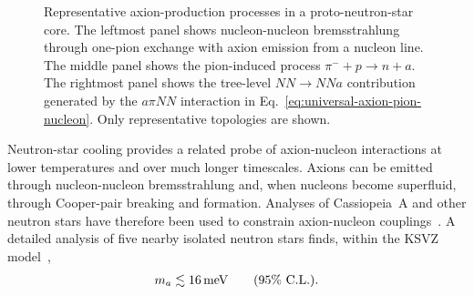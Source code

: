 \documentclass[review]{elsarticle}
\numberwithin{equation}{section}
\numberwithin{table}{section}
\numberwithin{figure}{section}
\begin{document}
\begin{figure}[t]
\begin{minipage}{0.32\textwidth}
    \end{minipage}

    \caption{Representative axion-production processes in a proto-neutron-star core. The leftmost panel shows nucleon-nucleon bremsstrahlung through one-pion exchange with axion emission from a nucleon line. The middle panel shows the pion-induced process $\pi^-+p\rightarrow n+a$. The rightmost panel shows the tree-level $NN\rightarrow NNa$ contribution generated by the $a\pi NN$ interaction in Eq.~\eqref{eq:universal-axion-pion-nucleon}. Only representative topologies are shown.}
    \label{fig:supernova-axion-processes}
\end{figure}

Neutron-star cooling provides a related probe of axion-nucleon interactions at lower temperatures and over much longer timescales. Axions can be emitted through nucleon-nucleon bremsstrahlung and, when nucleons become superfluid, through Cooper-pair breaking and formation. Analyses of Cassiopeia~A and other neutron stars have therefore been used to constrain axion-nucleon couplings~\cite{Hamaguchi:2018oqw}. A detailed analysis of five nearby isolated neutron stars finds, within the KSVZ model~\cite{Buschmann:2021juv},
\begin{align}
    m_a
    \lesssim
    16\,{\rm meV}
    \qquad
    (95\%~{\rm C.L.}).
    \label{eq:NS-KSVZ-bound}
\end{align}
\end{document}
